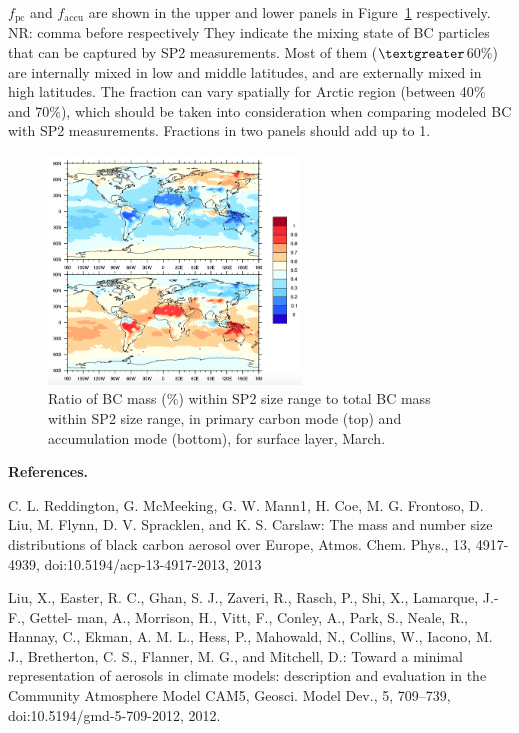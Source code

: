 \documentclass[11pt]{article}
\newcommand{\nrtodo}[1]{{\color{blue} NR: #1}}
\begin{document}
\noindent $f_{\text{pc}}$ and $f_{\text{accu}}$ are shown in the upper
and lower panels in Figure~\ref{fig_P3} respectively. \nrtodo{comma
  before respectively} They indicate the mixing state of BC particles
that can be captured by SP2 measurements. Most of them
($\textgreater$60$\%$) are internally mixed in low and middle
latitudes, and are externally mixed in high latitudes. The fraction
can vary spatially for Arctic region (between 40$\%$ and 70$\%$),
which should be taken into consideration when comparing modeled BC
with SP2 measurements. Fractions in two panels should add up to 1.


\begin{figure}[!h] 
	\begin{center}
		\includegraphics[width = 0.6\textwidth]{Rplot03}
		\caption[]{\label{fig_P3} Ratio of BC mass ($\%$) within SP2 size range to total BC mass within SP2 size range, in primary carbon mode (top) and accumulation mode (bottom), for surface layer, March.}
	\end{center}
\end{figure}





\clearpage
\noindent \textbf{References. }

C. L. Reddington, G. McMeeking, G. W. Mann1, H. Coe, M. G. Frontoso, D. Liu, M. Flynn, D. V. Spracklen, and K. S. Carslaw: The mass and number size distributions of black carbon aerosol over Europe, Atmos. Chem. Phys., 13, 4917-4939, doi:10.5194/acp-13-4917-2013, 2013

Liu, X., Easter, R. C., Ghan, S. J., Zaveri, R., Rasch, P., Shi, X., Lamarque, J.-F., Gettel- man, A., Morrison, H., Vitt, F., Conley, A., Park, S., Neale, R., Hannay, C., Ekman, A. M. L., Hess, P., Mahowald, N., Collins, W., Iacono, M. J., Bretherton, C. S., Flanner, M. G., and Mitchell, D.: Toward a minimal representation of aerosols in climate models: description and evaluation in the Community Atmosphere Model CAM5, Geosci. Model Dev., 5, 709–739, doi:10.5194/gmd-5-709-2012, 2012.
\end{document}
